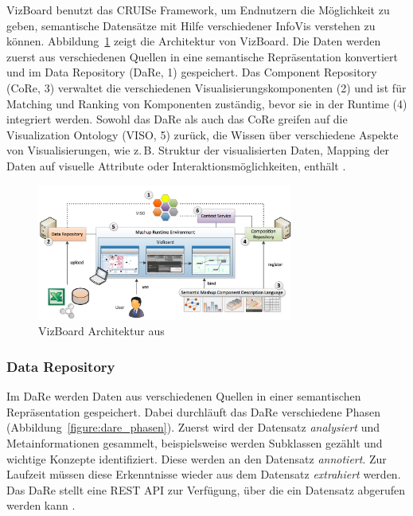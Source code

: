 \documentclass[
	headsepline,
	footsepline,
	fontsize=12pt,
	bibliography=totoc
]{scrbook}
\begin{document}
VizBoard \cite{Voigt2013} benutzt das CRUISe Framework, um Endnutzern die Möglichkeit zu geben, semantische Datensätze mit Hilfe verschiedener InfoVis verstehen zu können. Abbildung~\ref{figure:vizboard_architektur} zeigt die Architektur von VizBoard. Die Daten werden zuerst aus verschiedenen Quellen in eine semantische Repräsentation konvertiert und im Data Repository (DaRe, 1) gespeichert. Das Component Repository (CoRe, 3) verwaltet die verschiedenen Visualisierungskomponenten (2) und ist für Matching und Ranking von Komponenten zuständig, bevor sie in der Runtime (4) integriert werden. Sowohl das DaRe als auch das CoRe greifen auf die Visualization Ontology (VISO, 5) zurück, die Wissen über verschiedene Aspekte von Visualisierungen, wie z.\,B. Struktur der visualisierten Daten, Mapping der Daten auf visuelle Attribute oder Interaktionsmöglichkeiten, enthält \cite{Polowinski2013}.

\begin{figure}[htbp]
	\centering
	\includegraphics[width=0.75\textwidth]{images/grundlagen-vizboard_architektur.png}
	\caption{VizBoard Architektur aus \cite{Voigt2013}}
	\label{figure:vizboard_architektur}
\end{figure}

\subsubsection{Data Repository}
\label{section:standderforschung_data_repository}

Im DaRe werden Daten aus verschiedenen Quellen in einer semantischen Repräsentation gespeichert. Dabei durchläuft das DaRe verschiedene Phasen (Abbildung~\ref{figure:dare_phasen}). Zuerst wird der Datensatz \emph{analysiert} und Metainformationen gesammelt, beispielsweise werden Subklassen gezählt und wichtige Konzepte identifiziert. Diese werden an den Datensatz \emph{annotiert}. Zur Laufzeit müssen diese Erkenntnisse wieder aus dem Datensatz \emph{extrahiert} werden. Das DaRe stellt eine REST API zur Verfügung, über die ein Datensatz abgerufen werden kann \cite{Piccolotto2012}.
\end{document}
